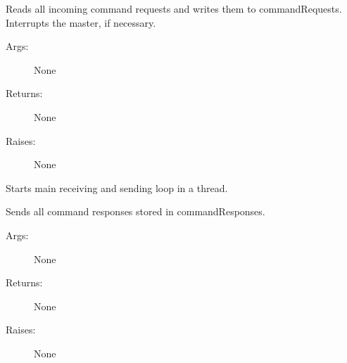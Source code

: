 \documentclass[letterpaper,10pt,english]{sphinxmanual}
\begin{document}
\begin{fulllineitems}
\begin{fulllineitems}
\begin{description}
\end{description}

\end{fulllineitems}


\begin{fulllineitems}
\label{communicationUtilities:communicationUtilities.CommandReceiver.receiveCommandRequests}
Reads all incoming command requests and writes them to commandRequests.
Interrupts the master, if necessary.
\begin{description}
\item[{Args:}] \leavevmode
None

\item[{Returns:}] \leavevmode
None

\item[{Raises:}] \leavevmode
None

\end{description}

\end{fulllineitems}


\begin{fulllineitems}
\label{communicationUtilities:communicationUtilities.CommandReceiver.run}
Starts main receiving and sending loop in a thread.

\end{fulllineitems}


\begin{fulllineitems}
\label{communicationUtilities:communicationUtilities.CommandReceiver.sendCommandResponses}
Sends all command responses stored in commandResponses.
\begin{description}
\item[{Args:}] \leavevmode
None

\item[{Returns:}] \leavevmode
None

\item[{Raises:}] \leavevmode
None

\end{description}

\end{fulllineitems}


\end{fulllineitems}
\end{document}
